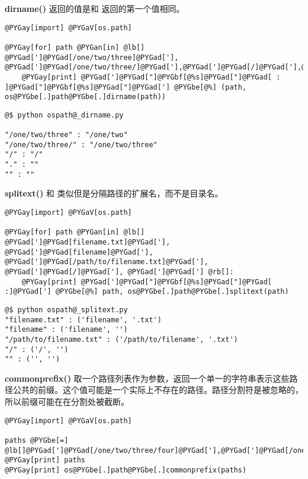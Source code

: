 \documentclass[a4paper,10pt,english]{manual}
\begin{document}
\textbf{dirname()} 返回的值是和  返回的第一个值相同。

\begin{Verbatim}[commandchars=@\[\]]
@PYGay[import] @PYGaV[os.path]

@PYGay[for] path @PYGan[in] @lb[] @PYGad[']@PYGad[/one/two/three]@PYGad['], @PYGad[']@PYGad[/one/two/three/]@PYGad['],@PYGad[']@PYGad[/]@PYGad['],@PYGad[']@PYGad[.]@PYGad['],@PYGad[']@PYGad[']@rb[]:
    @PYGay[print] @PYGad[']@PYGad["]@PYGbf[@%s]@PYGad["]@PYGad[ : ]@PYGad["]@PYGbf[@%s]@PYGad["]@PYGad['] @PYGbe[@%] (path, os@PYGbe[.]path@PYGbe[.]dirname(path))
\end{Verbatim}

\begin{Verbatim}[commandchars=@\[\]]
@$ python ospath@_dirname.py

"/one/two/three" : "/one/two"
"/one/two/three/" : "/one/two/three"
"/" : "/"
"." : ""
"" : ""
\end{Verbatim}

\textbf{splitext()} 和  类似但是分隔路径的扩展名，而不是目录名。

\begin{Verbatim}[commandchars=@\[\]]
@PYGay[import] @PYGaV[os.path]

@PYGay[for] path @PYGan[in] @lb[] @PYGad[']@PYGad[filename.txt]@PYGad['], @PYGad[']@PYGad[filename]@PYGad['], @PYGad[']@PYGad[/path/to/filename.txt]@PYGad['], @PYGad[']@PYGad[/]@PYGad['], @PYGad[']@PYGad['] @rb[]:
    @PYGay[print] @PYGad[']@PYGad["]@PYGbf[@%s]@PYGad["]@PYGad[ :]@PYGad['] @PYGbe[@%] path, os@PYGbe[.]path@PYGbe[.]splitext(path)
\end{Verbatim}

\begin{Verbatim}[commandchars=@\[\]]
@$ python ospath@_splitext.py
"filename.txt" : ('filename', '.txt')
"filename" : ('filename', '')
"/path/to/filename.txt" : ('/path/to/filename', '.txt')
"/" : ('/', '')
"" : ('', '')
\end{Verbatim}

\textbf{commonprefix()} 取一个路径列表作为参数，返回一个单一的字符串表示这些路径公共的前缀。这个值可能是一个实际上不存在的路径。路径分割符是被忽略的，所以前缀可能在在分割处被截断。

\begin{Verbatim}[commandchars=@\[\]]
@PYGay[import] @PYGaV[os.path]

paths @PYGbe[=] @lb[]@PYGad[']@PYGad[/one/two/three/four]@PYGad['],@PYGad[']@PYGad[/one/two/threefold]@PYGad['],@PYGad[']@PYGad[/one/two/three/]@PYGad['],@rb[]
@PYGay[print] paths
@PYGay[print] os@PYGbe[.]path@PYGbe[.]commonprefix(paths)
\end{Verbatim}
\end{document}
